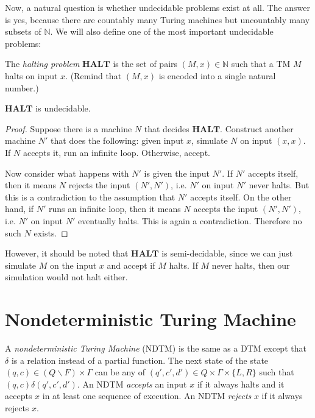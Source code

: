 	Now, a natural question is whether undecidable problems exist at all. The answer is yes, because there are countably many Turing machines but uncountably many subsets of $\mathbb{N}$. We will also define one of the most important undecidable problems:
	
	\begin{defn} \label{def_halting}
	    The \emph{halting problem} $\mathbf{HALT}$ is the set of pairs $(M,x) \in \mathbb{N}$ such that a TM $M$ halts on input $x$. (Remind that $(M,x)$ is encoded into a single natural number.)
	\end{defn}
	
	\begin{thm} \label{thm_halting}
	    $\mathbf{HALT}$ is undecidable.
	\end{thm}
	
	\begin{proof}
	    Suppose there is a machine $N$ that decides $\mathbf{HALT}$. Construct another machine $N'$ that does the following: given input $x$, simulate $N$ on input $(x,x)$. If $N$ accepts it, run an infinite loop. Otherwise, accept.
	    
	    Now consider what happens with $N'$ is given the input $N'$. If $N'$ accepts itself, then it means $N$ rejects the input $(N',N')$, i.e. $N'$ on input $N'$ never halts. But this is a contradiction to the assumption that $N'$ accepts itself. On the other hand, if $N'$ runs an infinite loop, then it means $N$ accepts the input $(N',N')$, i.e. $N'$ on input $N'$ eventually halts. This is again a contradiction. Therefore no such $N$ exists.
	\end{proof}
	
	However, it should be noted that $\mathbf{HALT}$ is semi-decidable, since we can just simulate $M$ on the input $x$ and accept if $M$ halts. If $M$ never halts, then our simulation would not halt either.
	
	\section{Nondeterministic Turing Machine}
	
	\begin{defn} \label{def_ndtm}
	    A \emph{nondeterministic Turing Machine} (NDTM) is the same as a DTM except that $\delta$ is a relation instead of a partial function. The next state of the state $(q,c) \in (Q\backslash F)\times\Gamma$ can be any of $(q',c',d') \in Q\times\Gamma\times\{L,R\}$ such that $(q,c)\delta(q',c',d')$. An NDTM \emph{accepts} an input $x$ if it always halts and it accepts $x$ in at least one sequence of execution. An NDTM \emph{rejects} $x$ if it always rejects $x$.
	\end{defn}
	
